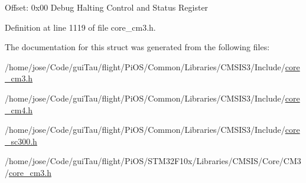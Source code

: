 Offset\-: 0x00 Debug Halting Control and Status Register 

Definition at line 1119 of file core\-\_\-cm3.\-h.



The documentation for this struct was generated from the following files\-:\begin{DoxyCompactItemize}
\item 
/home/jose/\-Code/gui\-Tau/flight/\-Pi\-O\-S/\-Common/\-Libraries/\-C\-M\-S\-I\-S3/\-Include/\hyperlink{_common_2_libraries_2_c_m_s_i_s3_2_include_2core__cm3_8h}{core\-\_\-cm3.\-h}\item 
/home/jose/\-Code/gui\-Tau/flight/\-Pi\-O\-S/\-Common/\-Libraries/\-C\-M\-S\-I\-S3/\-Include/\hyperlink{core__cm4_8h}{core\-\_\-cm4.\-h}\item 
/home/jose/\-Code/gui\-Tau/flight/\-Pi\-O\-S/\-Common/\-Libraries/\-C\-M\-S\-I\-S3/\-Include/\hyperlink{core__sc300_8h}{core\-\_\-sc300.\-h}\item 
/home/jose/\-Code/gui\-Tau/flight/\-Pi\-O\-S/\-S\-T\-M32\-F10x/\-Libraries/\-C\-M\-S\-I\-S/\-Core/\-C\-M3/\hyperlink{_s_t_m32_f10x_2_libraries_2_c_m_s_i_s_2_core_2_c_m3_2core__cm3_8h}{core\-\_\-cm3.\-h}\end{DoxyCompactItemize}
